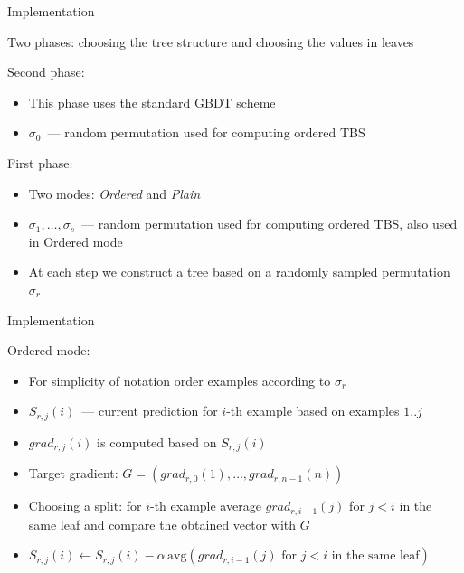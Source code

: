 \documentclass[pdf, 12pt, unicode]{beamer}
\newcommand{\1}{\mathbbm{1}}
\begin{document}
\begin{frame}{Implementation}

Two phases: choosing the tree structure and choosing the values in leaves

\-

Second phase:
\begin{itemize}
\item This phase uses the standard GBDT scheme 
\item $\sigma_0$~--- random permutation used for computing ordered TBS
\end{itemize}

\-
\pause

First phase:
\begin{itemize}
	\item Two modes: \textit{Ordered} and \textit{Plain}
	\item $\sigma_1, \ldots, \sigma_s$~--- random permutation used for computing ordered TBS, also used in Ordered mode
	\item At each step we construct a tree based on a randomly sampled permutation $\sigma_r$
\end{itemize}

\end{frame}

\begin{frame}{Implementation}

Ordered mode:
\begin{itemize}
	\item For simplicity of notation order examples according to $\sigma_r$
	\item $S_{r,j}(i)$~--- current prediction for $i$-th example based on examples $1..j$
	\item $grad_{r,j}(i)$ is computed based on $S_{r,j}(i)$
	\pause
	\item Target gradient: $G = (grad_{r,0}(1), \ldots, grad_{r,n-1}(n))$
	\item Choosing a split: for $i$-th example average $grad_{r,i-1}(j)$ for $j<i$ in the same leaf and compare the obtained vector with $G$
	\pause
	\item $S_{r,j}(i) \leftarrow S_{r,j}(i) - \alpha \, \mathrm{avg}(grad_{r,i-1}(j) \text{ for } j<i \text{ in the same leaf})$
\end{itemize}

\end{frame}
\end{document}
